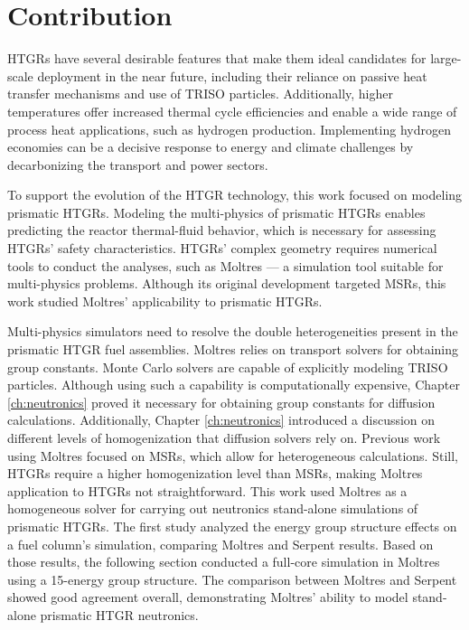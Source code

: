 \section{Contribution}

HTGRs have several desirable features that make them ideal candidates for large-scale deployment in the near future, including their reliance on passive heat transfer mechanisms and use of TRISO particles.
Additionally, higher temperatures offer increased thermal cycle efficiencies and enable a wide range of process heat applications, such as hydrogen production.
Implementing hydrogen economies can be a decisive response to energy and climate challenges by decarbonizing the transport and power sectors.

To support the evolution of the HTGR technology, this work focused on modeling prismatic HTGRs.
Modeling the multi-physics of prismatic HTGRs enables predicting the reactor thermal-fluid behavior, which is necessary for assessing HTGRs' safety characteristics.
HTGRs' complex geometry requires numerical tools to conduct the analyses, such as Moltres --- a simulation tool suitable for multi-physics problems.
Although its original development targeted MSRs, this work studied Moltres' applicability to prismatic HTGRs.

Multi-physics simulators need to resolve the double heterogeneities present in the prismatic HTGR fuel assemblies.
Moltres relies on transport solvers for obtaining group constants.
Monte Carlo solvers are capable of explicitly modeling TRISO particles.
Although using such a capability is computationally expensive, Chapter \ref{ch:neutronics} proved it necessary for obtaining group constants for diffusion calculations.
Additionally, Chapter \ref{ch:neutronics} introduced a discussion on different levels of homogenization that diffusion solvers rely on.
Previous work using Moltres focused on MSRs, which allow for heterogeneous calculations.
Still, HTGRs require a higher homogenization level than MSRs, making Moltres application to HTGRs not straightforward.
This work used Moltres as a homogeneous solver for carrying out neutronics stand-alone simulations of prismatic HTGRs.
The first study analyzed the energy group structure effects on a fuel column's simulation, comparing Moltres and Serpent results.
Based on those results, the following section conducted a full-core simulation in Moltres using a 15-energy group structure.
The comparison between Moltres and Serpent showed good agreement overall, demonstrating Moltres' ability to model stand-alone prismatic HTGR neutronics.

